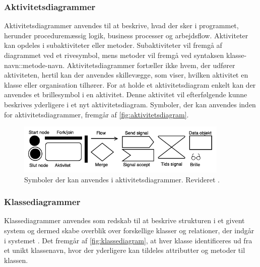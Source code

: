 \subsubsection{Aktivitetsdiagrammer} 
Aktivitetsdiagrammer anvendes til at beskrive, hvad der sker i programmet, herunder proceduremæssig logik, business processer og arbejdsflow. Aktiviteter kan opdeles i subaktiviteter eller metoder. Subaktiviteter vil fremgå af diagrammet ved et rivesymbol, mens metoder vil fremgå ved syntaksen klasse-navn::metode-navn. Aktivitetsdiagrammer fortæller ikke hvem, der udfører aktiviteten, hertil kan der anvendes skillevægge, som viser, hvilken aktivitet en klasse eller organisation tilhører. For at holde et aktivitetsdiagram enkelt kan der anvendes et brillesymbol i en aktivitet. Denne aktivitet vil efterfølgende kunne beskrives yderligere i et nyt aktivitetsdiagram.\cite{Fowler2004} Symboler, der kan anvendes inden for aktivitetsdiagrammer, fremgår af \autoref{fig:aktivitetsdiagram}.

\begin{figure} [H]
\centering
\includegraphics[width=0.9\textwidth]{figures/aktivitetsdiagram}
\caption{Symboler der kan anvendes i aktivitetsdiagrammer. Revideret \cite{Fowler2004}.}
\label{fig:aktivitetsdiagram}
\end{figure}




\subsubsection{Klassediagrammer}
Klassediagrammer anvendes som redskab til at beskrive strukturen i et givent system og dermed skabe overblik over forskellige klasser og relationer, der indgår i systemet \cite{Fowler2004}. Det fremgår af \autoref{fig:klassediagram}, at hver klasse identificeres ud fra et unikt klassenavn, hvor der yderligere kan tildeles attributter og metoder til klassen.

